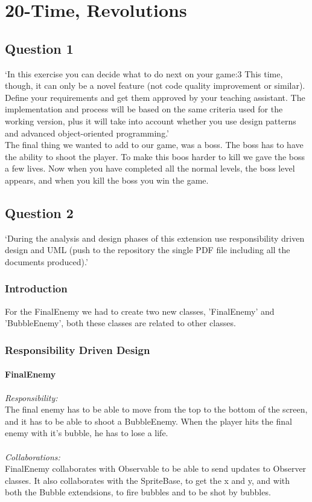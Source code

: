 \chapter{20-Time, Revolutions}

\section{Question 1}

`In this exercise you can decide what to do next on your game:3 This time, though, it can only be a
novel feature (not code quality improvement or similar).
Define your requirements and get them approved by your teaching assistant. The implementation
and process will be based on the same criteria used for the working version, plus it will take into
account whether you use design patterns and advanced object-oriented programming.' \\

The final thing we wanted to add to our game, was a boss. The boss has to have the ability to shoot the player. To make this boos harder to kill we gave the boss a few lives. Now when you have completed all the normal levels, the boss level appears, and when you kill the boss you win the game.

\section{Question 2}

`During the analysis and design phases of this extension use responsibility driven design and UML
(push to the repository the single PDF file including all the documents produced).'

\subsection{Introduction}

For the FinalEnemy we had to create two new classes, 'FinalEnemy' and 'BubbleEnemy', both these classes are related to other classes.

\subsection{Responsibility Driven Design} 

\subsubsection{FinalEnemy}
\textit{Responsibility:} \\
The final enemy has to be able to move from the top to the bottom of the screen, and it has to be able to shoot a BubbleEnemy. When the player hits the final enemy with it's bubble, he has to lose a life. \\ \\
\textit{Collaborations:} \\
FinalEnemy collaborates with Observable to be able to send updates to Observer classes. It also collaborates with  the SpriteBase, to get the x and y, and with both the Bubble extendsions, to fire bubbles and to be shot by bubbles.

